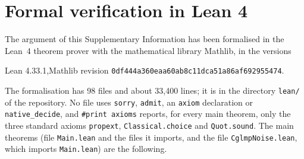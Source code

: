 \documentclass[11pt]{amsart}
\theoremstyle{definition}
\theoremstyle{remark}
\numberwithin{equation}{section}
\begin{document}
\section{Formal verification in Lean 4}\label{sec:lean}

The argument of this Supplementary Information has been formalised in the Lean~4 theorem prover\cite{Lean} with the
mathematical library Mathlib\cite{Mathlib}, in the versions
\begin{center}
Lean 4.33.1,\qquad Mathlib revision \texttt{0df444a360eaa60ab8c11dca51a86af692955474}.
\end{center}
The formalisation has 98 files and about 33,400 lines; it is in the directory \texttt{lean/} of the
repository\cite{repoOQP}. No file uses \texttt{sorry}, \texttt{admit}, an \texttt{axiom} declaration or
\texttt{native\_decide}, and \texttt{\#print axioms} reports, for every main theorem, only the three standard axioms
\texttt{propext}, \texttt{Classical.choice} and \texttt{Quot.sound}. The main theorems (file \texttt{Main.lean} and the
files it imports, and the file \texttt{CglmpNoise.lean}, which imports \texttt{Main.lean}) are the following.
\end{document}
